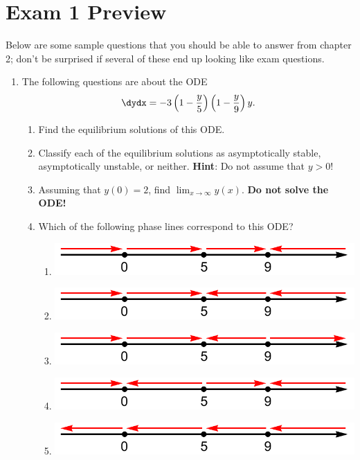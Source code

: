 \documentclass[12pt]{article}
\theoremstyle{definition}
\theoremstyle{underl}
\newcommand{\hintbf}[1]{\textbf{Hint}: #1}
\begin{document}
	\section*{\centering Exam 1 Preview}
	Below are some sample questions that you should be able to answer from chapter 2; don't be surprised if several of these end up looking like exam questions.
	
	\begin{enumerate}
		\item The following questions are about the ODE 
		$$\dydx=-3\left(1-\frac{y}{5}\right)\left(1-\frac{y}{9}\right) y.$$
		\begin{enumerate}[itemsep=0.25in, topsep=3mm, leftmargin=0.25in, rightmargin=0.25in]
			\item Find the equilibrium solutions of this ODE.
			\item Classify each of the equilibrium solutions as asymptotically stable, asymptotically unstable, or neither. \hintbf{Do not assume that $y>0$!}
			\item Assuming that $y(0)=2$, find $\lim_{x\to\infty}y(x)$. \textbf{Do not solve the ODE!}
			\item Which of the following phase lines correspond to this ODE?
				\begin{enumerate}[label=\roman*), topsep=6mm, itemsep=0.25in]
					\item \includegraphics[align=c,scale=0.75]{phase2}
					\item \includegraphics[align=c,scale=0.75]{phase3}
					\item \includegraphics[align=c,scale=0.75]{phase4}
					\item \includegraphics[align=c,scale=0.75]{phase1}
					\item \includegraphics[align=c,scale=0.75]{phase6}

\end{enumerate}
\end{enumerate}
\end{enumerate}
\end{document}
